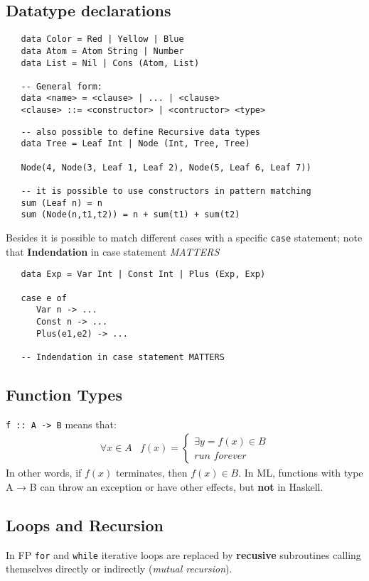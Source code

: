 \subsection{Datatype declarations}
\begin{lstlisting}
   data Color = Red | Yellow | Blue
   data Atom = Atom String | Number
   data List = Nil | Cons (Atom, List)

   -- General form:
   data <name> = <clause> | ... | <clause>
   <clause> ::= <constructor> | <contructor> <type>
\end{lstlisting}

\begin{lstlisting}
   -- also possible to define Recursive data types
   data Tree = Leaf Int | Node (Int, Tree, Tree)

   Node(4, Node(3, Leaf 1, Leaf 2), Node(5, Leaf 6, Leaf 7))

   -- it is possible to use constructors in pattern matching
   sum (Leaf n) = n
   sum (Node(n,t1,t2)) = n + sum(t1) + sum(t2)
\end{lstlisting}

Besides it is possible to match different cases with a specific \texttt{case} statement;
note that \textbf{Indendation} in case statement \textit{MATTERS}
\begin{lstlisting}
   data Exp = Var Int | Const Int | Plus (Exp, Exp)

   case e of
      Var n -> ...
      Const n -> ...
      Plus(e1,e2) -> ...

   -- Indendation in case statement MATTERS
\end{lstlisting}

\subsection{Function Types}
\lstinline{f :: A -> B} means that:
 \begin{align*}
   \forall x \in A & f(x) =
   \begin{cases}
      \exists y = f(x) \in B \\
      \textit{run forever}
   \end{cases}
\end{align*}
In other words, if $f(x)$ terminates, then $f(x) \in B$.
In ML, functions with type A → B can throw an exception or
have other effects, but \textbf{not} in Haskell.

\subsection{Loops and Recursion}
In FP \texttt{for} and \texttt{while} iterative loops are replaced by \textbf{recusive} subroutines calling themselves directly or indirectly (\textit{mutual recursion}).

